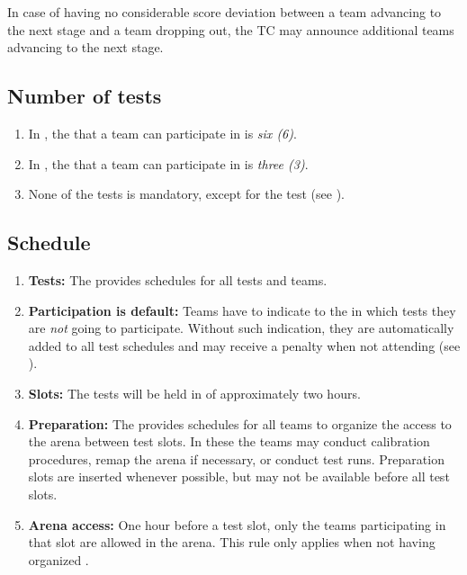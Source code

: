 In case of having no considerable score deviation between a team advancing to the next stage and a team dropping out, the TC may announce additional teams advancing to the next stage.


\subsection{Number of tests}\label{rule:number_of_tests}

\begin{enumerate}
	\item In , the  that a team can participate in is \emph{six (6)}.
	\item In , the  that a team can participate in is \emph{three (3)}.
	\item None of the tests is mandatory, except for the  test (see ).
\end{enumerate}


\subsection{Schedule}
\label{rule:schedule}

\begin{enumerate}
	\item \textbf{Tests:} The  provides schedules for all tests and teams. 
	\item \textbf{Participation is default:} Teams have to indicate to the  in which tests they are \emph{not} going to participate. Without such indication, they are automatically added to all test schedules and may receive a penalty when not attending (see ).
	\item \textbf{Slots:} The tests will be held in  of approximately two hours.
	\item \textbf{Preparation:} The  provides schedules for all teams to organize the access to the arena between test slots. In these  the teams may conduct calibration procedures, remap the arena if necessary, or conduct test runs.
	Preparation slots are inserted whenever possible, but may not be available before all test slots. 
	\item \textbf{Arena access:} One hour before a test slot, only the teams participating in that slot are allowed in the arena.
This rule only applies when not having organized .   
\end{enumerate}


